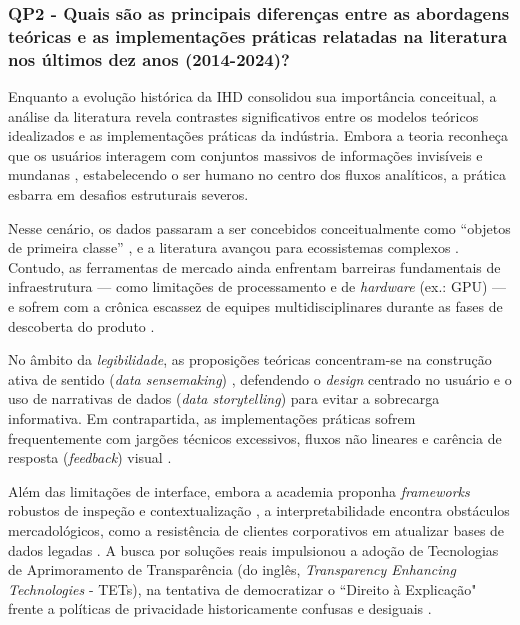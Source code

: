 \documentclass[
	12pt,				%
	oneside,			%
	a4paper,			%
	english,			%
	brazil				%
	]{abntex2ppgsi}
\begin{document}
    
    \subsubsection{QP2 - Quais são as principais diferenças entre as abordagens teóricas e as implementações práticas relatadas na literatura nos últimos dez anos (2014-2024)?}

    Enquanto a evolução histórica da IHD consolidou sua importância conceitual, a análise da literatura revela contrastes significativos entre os modelos teóricos idealizados e as implementações práticas da indústria. Embora a teoria reconheça que os usuários interagem com conjuntos massivos de informações invisíveis e mundanas \cite{Parviainen2016}, estabelecendo o ser humano no centro dos fluxos analíticos, a prática esbarra em desafios estruturais severos.
    
    Nesse cenário, os dados passaram a ser concebidos conceitualmente como ``objetos de primeira classe'' \cite{calvetti2024human, Raj2023}, e a literatura avançou para ecossistemas complexos \cite{bavaresco2019technological}. Contudo, as ferramentas de mercado ainda enfrentam barreiras fundamentais de infraestrutura --- como limitações de processamento e de \textit{hardware} (ex.: GPU) --- e sofrem com a crônica escassez de equipes multidisciplinares durante as fases de descoberta do produto \cite{sailaja2021exploring}.
    
    No âmbito da \emph{legibilidade}, as proposições teóricas concentram-se na construção ativa de sentido (\textit{data sensemaking}) \cite{capeleti2023heuristic, Yuan20243615}, defendendo o \textit{design} centrado no usuário e o uso de narrativas de dados (\textit{data storytelling}) para evitar a sobrecarga informativa. Em contrapartida, as implementações práticas sofrem frequentemente com jargões técnicos excessivos, fluxos não lineares e carência de resposta (\textit{feedback}) visual \cite{sailaja2021exploring}.
    
    Além das limitações de interface, embora a academia proponha \textit{frameworks} robustos de inspeção e contextualização \cite{koesten2021talking}, a interpretabilidade encontra obstáculos mercadológicos, como a resistência de clientes corporativos em atualizar bases de dados legadas \cite{sailaja2021exploring}. A busca por soluções reais impulsionou a adoção de Tecnologias de Aprimoramento de Transparência (do inglês, \textit{Transparency Enhancing Technologies} - TETs), na tentativa de democratizar o ``Direito à Explicação" frente a políticas de privacidade historicamente confusas e desiguais \cite{malgieri2020vulnerable, ferreira2024connecting, DeKreij2024}.
    
\end{document}
